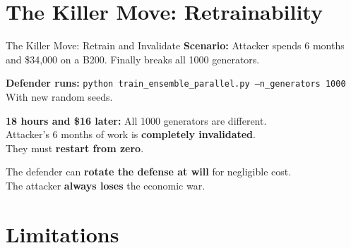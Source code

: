 \documentclass[aspectratio=169,11pt]{beamer}
\begin{document}
\section{The Killer Move: Retrainability}

\begin{frame}{The Killer Move: Retrain and Invalidate}
\textbf{Scenario:} Attacker spends 6 months and \$34,000 on a B200. Finally breaks all 1000 generators.

\vspace{0.5cm}
\textbf{Defender runs:}
\texttt{python train\_ensemble\_parallel.py --n\_generators 1000}
With new random seeds.

\vspace{0.5cm}
\textbf{18 hours and \$16 later:} All 1000 generators are different.\\
Attacker's 6 months of work is \textbf{completely invalidated}.\\
They must \textbf{restart from zero}.

\vspace{0.5cm}
\begin{center}
\large
The defender can \textbf{rotate the defense at will} for negligible cost.\\
The attacker \textbf{always loses} the economic war.
\end{center}
\end{frame}

\section{Limitations}
\end{document}
